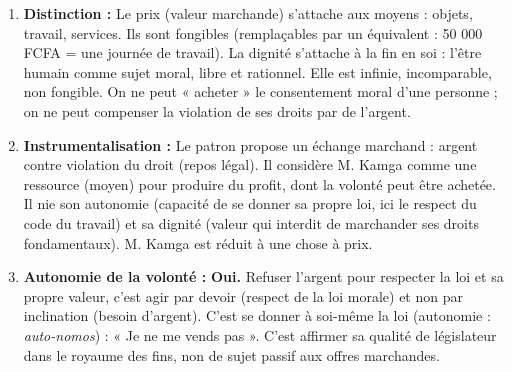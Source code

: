 \documentclass[11pt]{article}
\newcommand{\cle}[1]{{\popxbold\color{popdark}#1}}
\begin{document}
\begin{corrige}
\begin{enumerate}
    \item \textbf{Distinction :} Le \cle{prix} (valeur marchande) s'attache aux \cle{moyens} : objets, travail, services. Ils sont \cle{fongibles} (remplaçables par un équivalent : 50 000 FCFA = une journée de travail). La \cle{dignité} s'attache à la \cle{fin en soi} : l'être humain comme sujet moral, libre et rationnel. Elle est \cle{infinie}, \cle{incomparable}, \cle{non fongible}. On ne peut « acheter » le consentement moral d'une personne ; on ne peut compenser la violation de ses droits par de l'argent.
    \item \textbf{Instrumentalisation :} Le patron propose un \cle{échange marchand} : argent contre violation du droit (repos légal). Il considère M. Kamga comme une \cle{ressource} (moyen) pour produire du profit, dont la volonté peut être achetée. Il nie son \cle{autonomie} (capacité de se donner sa propre loi, ici le respect du code du travail) et sa \cle{dignité} (valeur qui interdit de marchander ses droits fondamentaux). M. Kamga est réduit à une \cle{chose} à prix.
    \item \textbf{Autonomie de la volonté :} \textbf{Oui.} Refuser l'argent pour respecter la loi et sa propre valeur, c'est agir par \cle{devoir} (respect de la loi morale) et non par \cle{inclination} (besoin d'argent). C'est se donner à soi-même la loi (autonomie : \emph{auto-nomos}) : « Je ne me vends pas ». C'est affirmer sa qualité de \cle{législateur} dans le \cle{royaume des fins}, non de sujet passif aux offres marchandes.
\end{enumerate}
\end{corrige}
\end{document}
